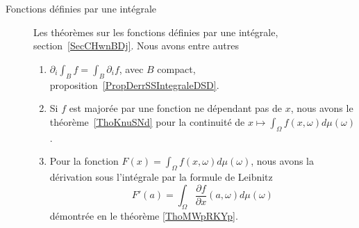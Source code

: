         \label{THEMEooJGEHooNzQkMT}
\begin{description}
    \item[Fonctions définies par une intégrale]
        Les théorèmes sur les fonctions définies par une intégrale, section~\ref{SecCHwnBDj}. Nous avons entre autres
        \begin{enumerate}
            \item
                \( \partial_i\int_Bf=\int_B\partial_if\), avec \( B\) compact, proposition~\ref{PropDerrSSIntegraleDSD}.
            \item
                Si \( f\) est majorée par une fonction ne dépendant pas de \( x\), nous avons le théorème~\ref{ThoKnuSNd} pour la continuité de \( x\mapsto \int_{\Omega}f(x,\omega)d\mu(\omega)\).
            \item
                Pour la fonction $F(x)=\int_{\Omega}f(x,\omega)d\mu(\omega)$, nous avons la dérivation sous l'intégrale par la formule de Leibnitz
                \begin{equation}
                    F'(a)=\int_{\Omega}\frac{ \partial f }{ \partial x }(a,\omega)d\mu(\omega)
                \end{equation}
                démontrée en le théorème \ref{ThoMWpRKYp}.


\end{enumerate}
\end{description}
